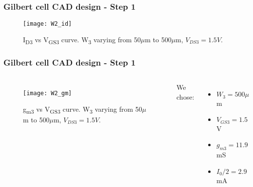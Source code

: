 \begin{frame}
	\frametitle{Gilbert cell CAD design - Step 1}
	\begin{figure}[H]
		\centering
		\texttt{[image: W2\_id]}
		\caption{I\textsubscript{D3} vs V\textsubscript{GS3} curve. W\textsubscript{3} varying from 50\(\mu\)m to 500\(\mu\)m, $V_{DS3} = 1.5 V$.}
		\label{fig:W_2_id}
	\end{figure}
\end{frame}

\begin{frame}
	\frametitle{Gilbert cell CAD design - Step 1}
	 \begin{columns}[c]
	 \begin{figure}[H]
	 	\centering
	 	\texttt{[image: W2\_gm]}
	 	\caption{g\textsubscript{m3} vs V\textsubscript{GS3} curve. W\textsubscript{3} varying from 50\(\mu\)m to 500\(\mu\)m, $V_{DS3} = 1.5 V$.}
	 	\label{fig:W_2_gm}
	 \end{figure}
 	 We chose:
 	 \begin{itemize}
 	 	\item $W_3=500\mu $m
 	 	\item $V_{GS3}=1.5 $V
 	 	\item $g_{m3}=11.9$mS
 	 	\item $I_0/2=2.9$mA
 	 \end{itemize}
	 \end{columns}
	
\end{frame}

